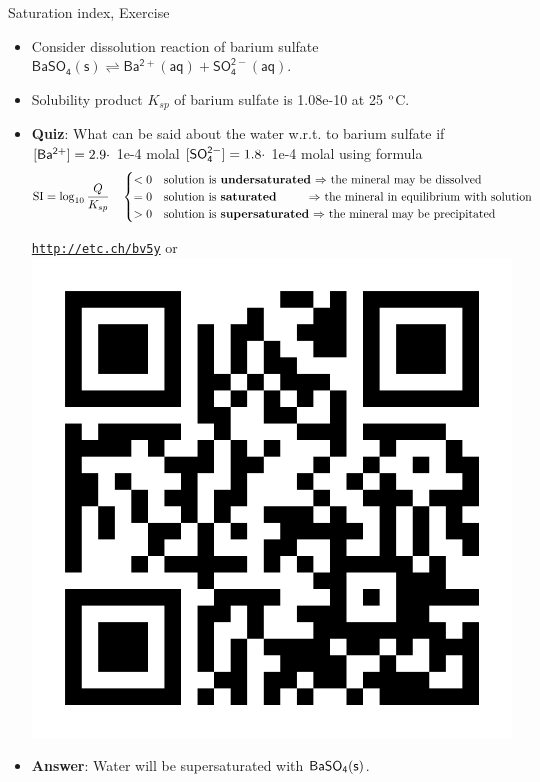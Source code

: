 \begin{frame}{Saturation index, Exercise}
	
%	

	\begin{itemize}
		\item Consider dissolution reaction of barium sulfate 
		$\mathsf{BaSO_4(s) \rightleftharpoons Ba^{2+}(aq) + SO_4^{2-}(aq).}$
		\item Solubility product $K_{sp}$ of barium sulfate is 1.08e-10 at 25 ${\rm ^\circ}$C.
		\item  \alert{\bf Quiz}: What can be said about the water w.r.t. to barium sulfate if \\
		${\sf [Ba^{2+}}]=2.9 \cdot$ 1e-4 molal
		${\sf [SO_4^{2-}]}=1.8 \cdot$ 1e-4 molal
		using formula
		{\footnotesize
		\[
            \mathrm{SI} 
            = \log_{10} \frac{Q}{K_{sp}} \quad 
            \begin{cases}
            < 0& \mbox{solution is \textbf{undersaturated} $\Rightarrow$ the mineral may be dissolved }\\
            = 0& \mbox{solution is \textbf{saturated} \qquad \:\,$\Rightarrow$ the mineral in equilibrium with solution}\\
            > 0 & \mbox{solution is \textbf{supersaturated} $\Rightarrow$ the mineral may be precipitated}
            \end{cases}
        \] 
        }
		\begin{center}
			\href{http://etc.ch/bv5y}{\textcolor{indigo(dye)}{\tt http://etc.ch/bv5y}} 
			\quad
			or 
			\quad
			\includegraphics[height=0.18\columnwidth]{figures/chemical-equilibrium/poll.png}
		\end{center}
		\hiddenpause
		\vskip 5pt
		\item {\bf Answer}: Water will be supersaturated with ${\sf BaSO_4(s)}$.
	\end{itemize}

\end{frame}
